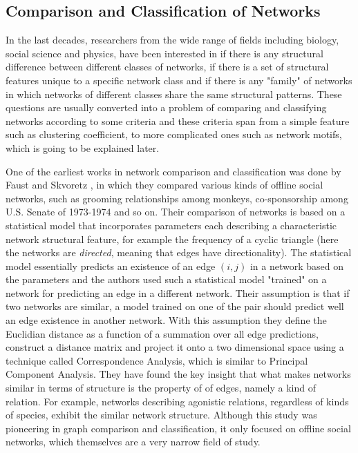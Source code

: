 \documentclass[..]{revtex4}
\begin{document}
	\subsection{Comparison and Classification of Networks}
	 In the last decades, researchers from the wide range of fields including biology, social science and physics, have been interested in if there is any structural difference between different classes of networks, if there is a set of structural features unique to a specific network class and if there is any "family" of networks in which networks of different classes share the same structural patterns. These questions are usually converted into a problem of comparing and classifying networks according to some criteria and these criteria span from a simple feature such as clustering coefficient, to more complicated ones such as network motifs, which is going to be explained later.
	
	One of the earliest works in network comparison and classification was done by Faust and Skvoretz \cite{Faust.Skvoretz2002Comparing}, in which they compared various kinds of offline social networks, such as grooming relationships among monkeys, co-sponsorship among U.S. Senate of 1973-1974 and so on. Their comparison of networks is based on a statistical model that incorporates parameters each describing a characteristic network structural feature, for example the frequency of a cyclic triangle (here the networks are \textit{directed}, meaning that edges have directionality). The statistical model essentially predicts an existence of an edge $(i,j)$ in a network based on the parameters and the authors used such a statistical model "trained" on a network for predicting an edge in a different network. Their assumption is that if two networks are similar, a model trained on one of the pair should predict well an edge existence in another network. With this assumption they define the Euclidian distance as a function of a summation over all edge predictions, construct a distance matrix and project it onto a two dimensional space using a technique called Correspondence Analysis, which is similar to Principal Component Analysis. They have found the key insight that what makes networks similar in terms of structure is the property of of edges, namely a kind of relation. For example, networks describing agonistic relations, regardless of kinds of species, exhibit the similar network structure. Although this study was pioneering in graph comparison and classification, it only focused on offline social networks, which themselves are a very narrow field of study.
	
\end{document}
